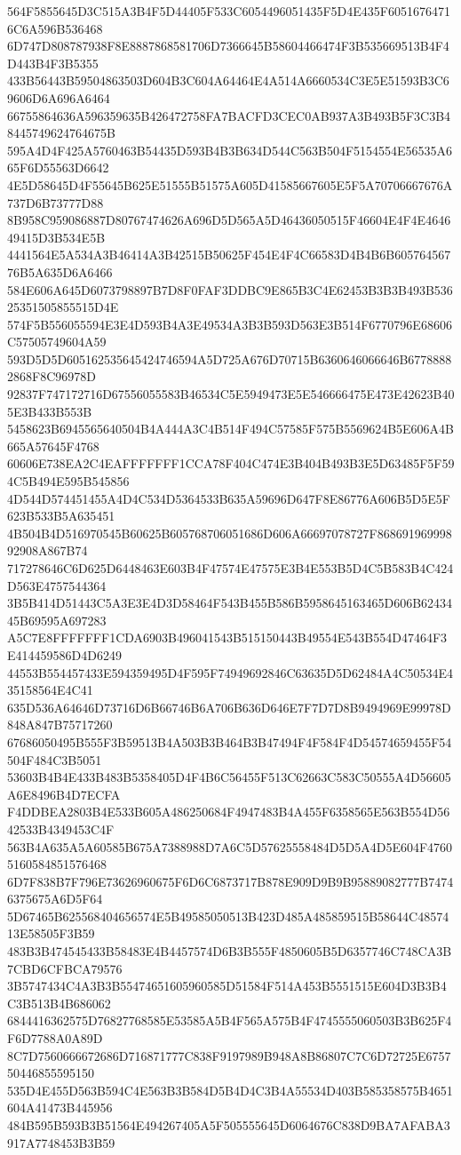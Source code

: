 {{{{{{{{{{{{{{{{{{{{{564F5855645D3C515A3B4F5D44405F533C6054496051435F5D4E435F60516764716C6A596B536468
6D747D808787938F8E8887868581706D7366645B58604466474F3B535669513B4F4D443B4F3B5355
433B56443B59504863503D604B3C604A64464E4A514A6660534C3E5E51593B3C69606D6A696A6464
66755864636A596359635B426472758FA7BACFD3CEC0AB937A3B493B5F3C3B48445749624764675B
595A4D4F425A5760463B54435D593B4B3B634D544C563B504F5154554E56535A665F6D55563D6642
4E5D58645D4F55645B625E51555B51575A605D41585667605E5F5A70706667676A737D6B73777D88
8B958C959086887D80767474626A696D5D565A5D46436050515F46604E4F4E464649415D3B534E5B
4441564E5A534A3B46414A3B42515B50625F454E4F4C66583D4B4B6B60576456776B5A635D6A6466
584E606A645D6073798897B7D8F0FAF3DDBC9E865B3C4E62453B3B3B493B53625351505855515D4E
574F5B556055594E3E4D593B4A3E49534A3B3B593D563E3B514F6770796E68606C57505749604A59
593D5D5D605162535645424746594A5D725A676D70715B6360646066646B67788882868F8C96978D
92837F747172716D67556055583B46534C5E5949473E5E546666475E473E42623B405E3B433B553B
5458623B6945565640504B4A444A3C4B514F494C57585F575B5569624B5E606A4B665A57645F4768
60606E738EA2C4EAFFFFFFF1CCA78F404C474E3B404B493B3E5D63485F5F594C5B494E595B545856
4D544D574451455A4D4C534D5364533B635A59696D647F8E86776A606B5D5E5F623B533B5A635451
4B504B4D516970545B60625B605768706051686D606A66697078727F86869196999892908A867B74
717278646C6D625D6448463E603B4F47574E47575E3B4E553B5D4C5B583B4C424D563E4757544364
3B5B414D51443C5A3E3E4D3D58464F543B455B586B5958645163465D606B6243445B69595A697283
A5C7E8FFFFFFF1CDA6903B496041543B515150443B49554E543B554D47464F3E414459586D4D6249
44553B554457433E594359495D4F595F74949692846C63635D5D62484A4C50534E435158564E4C41
635D536A64646D73716D6B66746B6A706B636D646E7F7D7D8B9494969E99978D848A847B75717260
67686050495B555F3B59513B4A503B3B464B3B47494F4F584F4D54574659455F54504F484C3B5051
53603B4B4E433B483B5358405D4F4B6C56455F513C62663C583C50555A4D56605A6E8496B4D7ECFA
F4DDBEA2803B4E533B605A486250684F4947483B4A455F6358565E563B554D5642533B4349453C4F
563B4A635A5A60585B675A7388988D7A6C5D57625558484D5D5A4D5E604F47605160584851576468
6D7F838B7F796E73626960675F6D6C6873717B878E909D9B9B95889082777B74746375675A6D5F64
5D67465B625568404656574E5B49585050513B423D485A485859515B58644C4857413E58505F3B59
483B3B474545433B58483E4B4457574D6B3B555F4850605B5D6357746C748CA3B7CBD6CFBCA79576
3B5747434C4A3B3B55474651605960585D51584F514A453B5551515E604D3B3B4C3B513B4B686062
6844416362575D76827768585E53585A5B4F565A575B4F4745555060503B3B625F4F6D7788A0A89D
8C7D7560666672686D716871777C838F9197989B948A8B86807C7C6D72725E675750446855595150
535D4E455D563B594C4E563B3B584D5B4D4C3B4A55534D403B585358575B4651604A41473B445956
484B595B593B3B51564E494267405A5F505555645D6064676C838D9BA7AFABA3917A7748453B3B59
}}}}}}}}}}}}}}}}}}}}}
